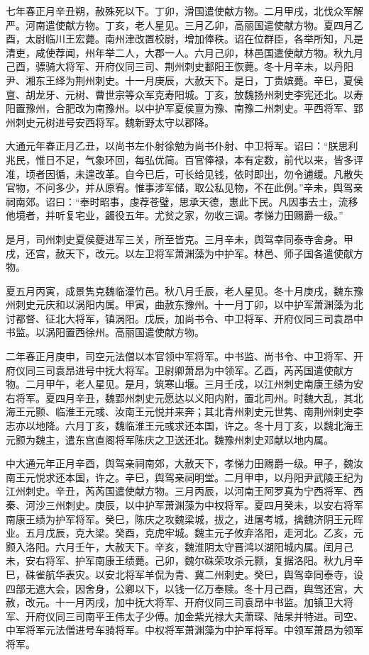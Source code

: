 \documentclass[12pt,UTF8]{ctexbook}
\begin{document}
七年春正月辛丑朔，赦殊死以下。丁卯，滑国遣使献方物。二月甲戌，北伐众军解严。河南遣使献方物。丁亥，老人星见。三月乙卯，高丽国遣使献方物。夏四月乙酉，太尉临川王宏薨。南州津改置校尉，增加俸秩。诏在位群臣，各举所知，凡是清吏，咸使荐闻，州年举二人，大郡一人。六月己卯，林邑国遣使献方物。秋九月己酉，骠骑大将军、开府仪同三司、荆州刺史鄱阳王恢薨。冬十月辛未，以丹阳尹、湘东王绎为荆州刺史。十一月庚辰，大赦天下。是日，丁贵嫔薨。辛巳，夏侯亶、胡龙牙、元树、曹世宗等众军克寿阳城。丁亥，放魏扬州刺史李宪还北。以寿阳置豫州，合肥改为南豫州。以中护军夏侯亶为豫、南豫二州刺史。平西将军、郢州刺史元树进号安西将军。魏新野太守以郡降。

大通元年春正月乙丑，以尚书左仆射徐勉为尚书仆射、中卫将军。诏曰：“朕思利兆民，惟日不足，气象环回，每弘优简。百官俸禄，本有定数，前代以来，皆多评准，顷者因循，未遑改革。自今已后，可长给见钱，依时即出，勿令逋缓。凡散失官物，不问多少，并从原宥。惟事涉军储，取公私见物，不在此例。”辛未，舆驾亲祠南郊。诏曰：“奉时昭事，虔荐苍璧，思承天德，惠此下民。凡因事去土，流移他境者，并听复宅业，蠲役五年。尤贫之家，勿收三调。孝悌力田赐爵一级。”

是月，司州刺史夏侯夔进军三关，所至皆克。三月辛未，舆驾幸同泰寺舍身。甲戌，还宫，赦天下，改元。以左卫将军萧渊藻为中护军。林邑、师子国各遣使献方物。

夏五月丙寅，成景隽克魏临潼竹邑。秋八月壬辰，老人星见。冬十月庚戌，魏东豫州刺史元庆和以涡阳内属。甲寅，曲赦东豫州。十一月丁卯，以中护军萧渊藻为北讨都督、征北大将军，镇涡阳。戊辰，加尚书令、中卫将军、开府仪同三司袁昂中书监。以涡阳置西徐州。高丽国遣使献方物。

二年春正月庚申，司空元法僧以本官领中军将军。中书监、尚书令、中卫将军、开府仪同三司袁昂进号中抚大将军。卫尉卿萧昂为中领军。乙酉，芮芮国遣使献方物。二月甲午，老人星见。是月，筑寒山堰。三月壬戌，以江州刺史南康王绩为安右将军。夏四月辛丑，魏郢州刺史元愿达以义阳内附，置北司州。时魏大乱，其北海王元颢、临淮王元彧、汝南王元悦并来奔；其北青州刺史元世隽、南荆州刺史李志亦以地降。六月丁亥，魏临淮王元彧求还本国，许之。冬十月丁亥，以魏北海王元颢为魏主，遣东宫直阁将军陈庆之卫送还北。魏豫州刺史邓献以地内属。

中大通元年正月辛酉，舆驾亲祠南郊，大赦天下，孝悌力田赐爵一级。甲子，魏汝南王元悦求还本国，许之。辛巳，舆驾亲祠明堂。二月甲申，以丹阳尹武陵王纪为江州刺史。辛丑，芮芮国遣使献方物。三月丙辰，以河南王阿罗真为宁西将军、西秦、河沙三州刺史。庚辰，以中护军萧渊藻为中权将军。夏四月癸未，以安右将军南康王绩为护军将军。癸巳，陈庆之攻魏梁城，拔之，进屠考城，擒魏济阴王元晖业。五月戊辰，克大梁。癸酉，克虎牢城。魏主元子攸弃洛阳，走河北。乙亥，元颢入洛阳。六月壬午，大赦天下。辛亥，魏淮阴太守晋鸿以湖阳城内属。闰月己未，安右将军、护军南康王绩薨。己卯，魏尔硃荣攻杀元颢，复据洛阳。秋九月辛巳，硃雀航华表灾。以安北将军羊侃为青、冀二州刺史。癸巳，舆驾幸同泰寺，设四部无遮大会，因舍身，公卿以下，以钱一亿万奉赎。冬十月己酉，舆驾还宫，大赦，改元。十一月丙戌，加中抚大将军、开府仪同三司袁昂中书监。加镇卫大将军、开府仪同三司南平王伟太子少傅。加金紫光禄大夫萧琛、陆杲并特进。司空、中军将军元法僧进号车骑将军。中权将军萧渊藻为中护军将军。中领军萧昂为领军将军。
\end{document}
